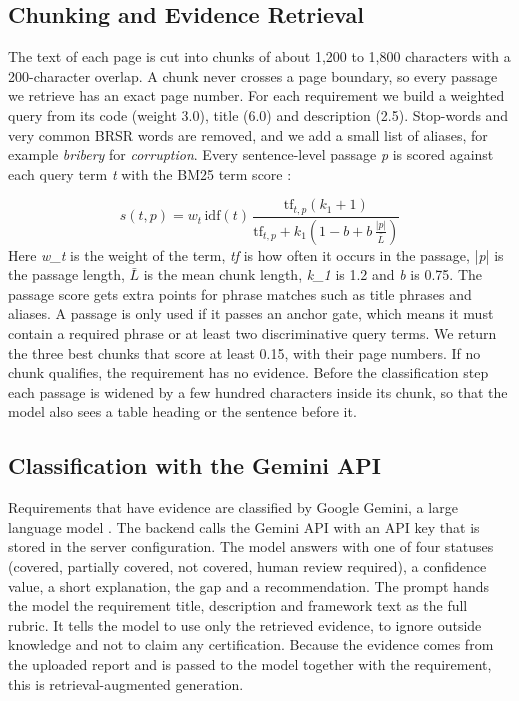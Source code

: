 \documentclass[conference]{IEEEtran}
\begin{document}
\subsection{Chunking and Evidence Retrieval}
The text of each page is cut into chunks of about 1,200 to 1,800 characters with a 200-character overlap. A chunk never crosses a page boundary, so every passage we retrieve has an exact page number. For each requirement we build a weighted query from its code (weight 3.0), title (6.0) and description (2.5). Stop-words and very common BRSR words are removed, and we add a small list of aliases, for example \textit{bribery} for \textit{corruption}. Every sentence-level passage \textit{p} is scored against each query term \textit{t} with the BM25 term score \cite{b11}:

\begin{equation}s(t,p)=w_t\,\mathrm{idf}(t)\,\frac{\mathrm{tf}_{t,p}(k_1+1)}{\mathrm{tf}_{t,p}+k_1\left(1-b+b\,\frac{|p|}{\bar L}\right)}\end{equation}
Here \textit{w\_t} is the weight of the term, \textit{tf} is how often it occurs in the passage, |\textit{p}| is the passage length, \textit{$\bar{L}$} is the mean chunk length, \textit{k\_1} is 1.2 and \textit{b} is 0.75. The passage score gets extra points for phrase matches such as title phrases and aliases. A passage is only used if it passes an anchor gate, which means it must contain a required phrase or at least two discriminative query terms. We return the three best chunks that score at least 0.15, with their page numbers. If no chunk qualifies, the requirement has no evidence. Before the classification step each passage is widened by a few hundred characters inside its chunk, so that the model also sees a table heading or the sentence before it.

\subsection{Classification with the Gemini API}
Requirements that have evidence are classified by Google Gemini, a large language model \cite{b13}. The backend calls the Gemini API with an API key that is stored in the server configuration. The model answers with one of four statuses (covered, partially covered, not covered, human review required), a confidence value, a short explanation, the gap and a recommendation. The prompt hands the model the requirement title, description and framework text as the full rubric. It tells the model to use only the retrieved evidence, to ignore outside knowledge and not to claim any certification. Because the evidence comes from the uploaded report and is passed to the model together with the requirement, this is retrieval-augmented generation.
\end{document}
